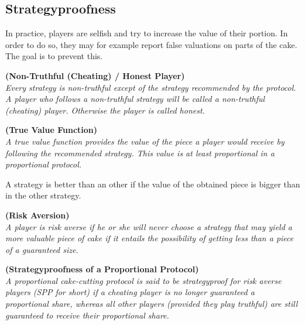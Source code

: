 \subsection{Strategyproofness}
In practice, players are selfish and try to increase the value of their portion. In order to do so, they may for example report false valuations on parts of the cake. The goal is to prevent this.
\begin{defi}{\textbf{(Non-Truthful (Cheating) / Honest Player)}}\\
\emph{Every strategy is \emph{non-truthful} except of the strategy recommended by the protocol. A player who follows a non-truthful strategy will be called a \emph{non-truthful (cheating) player}. Otherwise the player is called \emph{honest}.}
\end{defi}
\begin{defi}{\textbf{(True Value Function)}}\\
\emph{A \emph{true value function} provides the value of the piece a player would receive by following the recommended strategy. This value is at least proportional in a proportional protocol.}
\end{defi}
A strategy is better than an other if the value of the obtained piece is bigger than in the other strategy.
\begin{defi}{\textbf{(Risk Aversion\cite{brams})}}\\
\emph{A player is \emph{risk averse} if he or she will never choose a strategy that may yield a more valuable piece of cake if it entails the possibility of getting less than a piece of a guaranteed size.}
\end{defi}
\begin{defi}{\textbf{(Strategyproofness of a Proportional Protocol\cite{lindner:degrees})}}\\
\emph{A proportional cake-cutting protocol is said to be \emph{strategyproof for risk averse players} (SPP for short) if a cheating player is no longer guaranteed a proportional share, whereas all other players (provided they play truthful) are still guaranteed to receive their proportional share.}
\end{defi}

